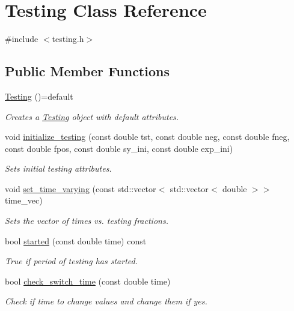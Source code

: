 \hypertarget{classTesting}{}\section{Testing Class Reference}
\label{classTesting}


{\ttfamily \#include $<$testing.\+h$>$}

\subsection*{Public Member Functions}
\begin{DoxyCompactItemize}
\item 
\hyperlink{classTesting_aeeb2ffdd21714053d03aeddc1209649c}{Testing} ()=default
\begin{DoxyCompactList}\small\item\em Creates a \hyperlink{classTesting}{Testing} object with default attributes. \end{DoxyCompactList}\item 
void \hyperlink{classTesting_ad618be281d4c48922f30287d8c8f4379}{initialize\+\_\+testing} (const double tst, const double neg, const double fneg, const double fpos, const double sy\+\_\+ini, const double exp\+\_\+ini)
\begin{DoxyCompactList}\small\item\em Sets initial testing attributes. \end{DoxyCompactList}\item 
void \hyperlink{classTesting_a38e9c00e44647bcb952ed4b1d5c712c8}{set\+\_\+time\+\_\+varying} (const std\+::vector$<$ std\+::vector$<$ double $>$$>$ time\+\_\+vec)
\begin{DoxyCompactList}\small\item\em Sets the vector of times vs. testing fractions. \end{DoxyCompactList}\item 
bool \hyperlink{classTesting_a1bbf23d75941e99cca81e6e17fb3317c}{started} (const double time) const
\begin{DoxyCompactList}\small\item\em True if period of testing has started. \end{DoxyCompactList}\item 
bool \hyperlink{classTesting_a4d34e310ca89cab5515d6dde01e8183a}{check\+\_\+switch\+\_\+time} (const double time)
\begin{DoxyCompactList}\small\item\em Check if time to change values and change them if yes. \end{DoxyCompactList}\item 
$$
\end{DoxyCompactItemize}
